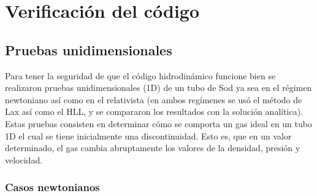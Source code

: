 \documentclass[12pt,a4paper]{book}
\begin{document}

\chapter{Verificación del código}\label{cap:Verificacion_del_codigo}


\section{Pruebas unidimensionales}

Para tener la seguridad de que el código hidrodinámico funcione bien se realizaron pruebas  unidimensionales (1D)
de un tubo de Sod ya sea en el régimen newtoniano así como en el relativista (en ambos regímenes se usó
el método de Lax así como el HLL, y se compararon los resultados con la solución analítica). 
Estas pruebas consisten en determinar cómo se comporta un gas ideal en un tubo 1D 
el cual se tiene inicialmente una discontinuidad. Esto es, que en un valor determinado,
el gas cambia abruptamente los valores de la densidad, presión y velocidad.




\subsection{Casos newtonianos} \label{subsec:casos_newtonianos_1D}
\end{document}

